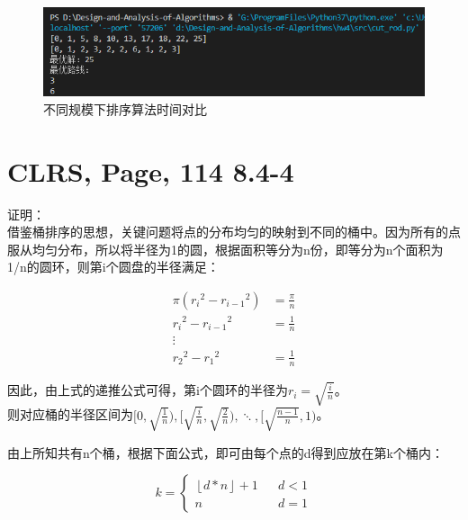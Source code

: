 \documentclass[UTF8]{ctexart}
\begin{document}
\begin{figure}[H]
    \centering
    \includegraphics[width=1\textwidth]{img/res-1.png}
    \caption{不同规模下排序算法时间对比}
    \label{带切割方案的备忘录方法}
\end{figure}



\section{CLRS, Page, 114 8.4-4}

证明：\\
借鉴桶排序的思想，关键问题将点的分布均匀的映射到不同的桶中。因为所有的点服从均匀分布，所以将半径为1的圆，根据面积等分为n份，即等分为n个面积为1/n的圆环，则第i个圆盘的半径满足：

\begin{align*}
    \pi({r_i}^2-{r_{i-1}}^2) &= \frac{\pi}{n} \\
    {r_i}^2-{r_{i-1}}^2 &= \frac{1}{n}\\
    \vdots\\
    {r_2}^2-{r_{1}}^2 &= \frac{1}{n}
\end{align*}

因此，由上式的递推公式可得，第i个圆环的半径为$r_i=\sqrt{\frac{i}{n}}$。\\
则对应桶的半径区间为$[0,\sqrt{\frac{1}{n}}), [\sqrt{\frac{i}{n}}, \sqrt{\frac{2}{n}}), \ddots, [\sqrt{\frac{n-1}{n}}, 1) $。

由上所知共有n个桶，根据下面公式，即可由每个点的d得到应放在第k个桶内：

\begin{equation*}
    k=\left\{
    \begin{array}{rcl}
    \left\lfloor d * n\right\rfloor + 1 & & {d < 1}\\
    n & & {d = 1}
    \end{array} \right.
\end{equation*}
  
\end{document}
